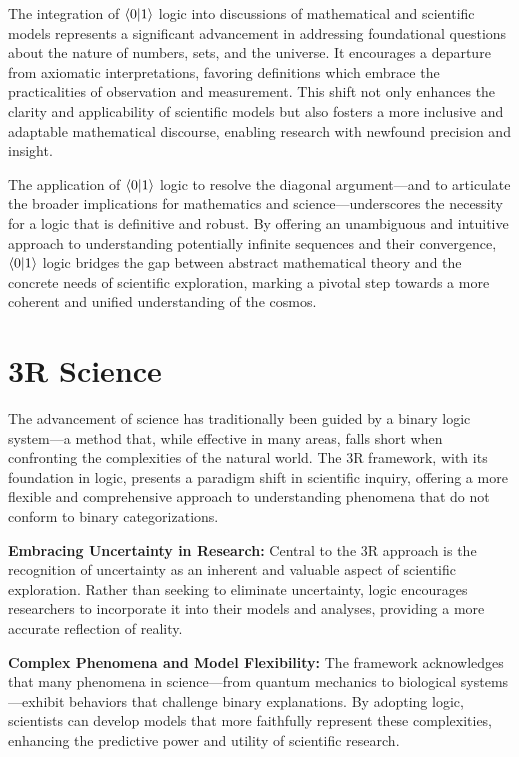 \documentclass[12pt]{article}
\begin{document}
The integration of \(\langle 0 | 1 \rangle\) logic into discussions of mathematical and scientific models represents a significant advancement in addressing foundational questions about the nature of numbers, sets, and the universe. It encourages a departure from axiomatic interpretations, favoring definitions which embrace the practicalities of observation and measurement. This shift not only enhances the clarity and applicability of scientific models but also fosters a more inclusive and adaptable mathematical discourse, enabling research with newfound precision and insight.

The application of \(\langle 0 | 1 \rangle\) logic to resolve the diagonal argument—and to articulate the broader implications for mathematics and science—underscores the necessity for a logic that is definitive and robust. By offering an unambiguous and intuitive approach to understanding potentially infinite sequences and their convergence, \(\langle 0 | 1 \rangle\) logic bridges the gap between abstract mathematical theory and the concrete needs of scientific exploration, marking a pivotal step towards a more coherent and unified understanding of the cosmos.

\section*{3R Science}

The advancement of science has traditionally been guided by a binary logic system—a method that, while effective in many areas, falls short when confronting the complexities of the natural world. The 3R framework, with its foundation in \qbit{} logic, presents a paradigm shift in scientific inquiry, offering a more flexible and comprehensive approach to understanding phenomena that do not conform to binary categorizations.

\textbf{Embracing Uncertainty in Research:} Central to the 3R approach is the recognition of uncertainty as an inherent and valuable aspect of scientific exploration. Rather than seeking to eliminate uncertainty, \qbit{} logic encourages researchers to incorporate it into their models and analyses, providing a more accurate reflection of reality.

\textbf{Complex Phenomena and Model Flexibility:} The framework acknowledges that many phenomena in science—from quantum mechanics to biological systems—exhibit behaviors that challenge binary explanations. By adopting \qbit{} logic, scientists can develop models that more faithfully represent these complexities, enhancing the predictive power and utility of scientific research.
\end{document}
